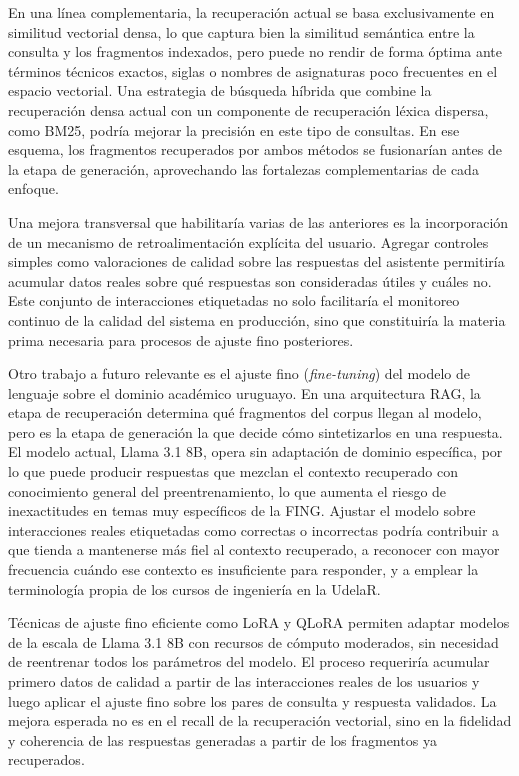 En una línea complementaria, la recuperación actual se basa exclusivamente en similitud vectorial densa, lo que captura bien la similitud semántica entre la consulta y los fragmentos indexados, pero puede no rendir de forma óptima ante términos técnicos exactos, siglas o nombres de asignaturas poco frecuentes en el espacio vectorial. Una estrategia de búsqueda híbrida que combine la recuperación densa actual con un componente de recuperación léxica dispersa, como BM25, podría mejorar la precisión en este tipo de consultas. En ese esquema, los fragmentos recuperados por ambos métodos se fusionarían antes de la etapa de generación, aprovechando las fortalezas complementarias de cada enfoque.

Una mejora transversal que habilitaría varias de las anteriores es la incorporación de un mecanismo de retroalimentación explícita del usuario. Agregar controles simples como valoraciones de calidad sobre las respuestas del asistente permitiría acumular datos reales sobre qué respuestas son consideradas útiles y cuáles no. Este conjunto de interacciones etiquetadas no solo facilitaría el monitoreo continuo de la calidad del sistema en producción, sino que constituiría la materia prima necesaria para procesos de ajuste fino posteriores.

Otro trabajo a futuro relevante es el ajuste fino (\textit{fine-tuning}) del modelo de lenguaje sobre el dominio académico uruguayo. En una arquitectura RAG, la etapa de recuperación determina qué fragmentos del corpus llegan al modelo, pero es la etapa de generación la que decide cómo sintetizarlos en una respuesta. El modelo actual, Llama 3.1 8B, opera sin adaptación de dominio específica, por lo que puede producir respuestas que mezclan el contexto recuperado con conocimiento general del preentrenamiento, lo que aumenta el riesgo de inexactitudes en temas muy específicos de la FING. Ajustar el modelo sobre interacciones reales etiquetadas como correctas o incorrectas podría contribuir a que tienda a mantenerse más fiel al contexto recuperado, a reconocer con mayor frecuencia cuándo ese contexto es insuficiente para responder, y a emplear la terminología propia de los cursos de ingeniería en la UdelaR.

Técnicas de ajuste fino eficiente como LoRA \cite{hu2022lora} y QLoRA \cite{dettmers2023qlora} permiten adaptar modelos de la escala de Llama 3.1 8B con recursos de cómputo moderados, sin necesidad de reentrenar todos los parámetros del modelo. El proceso requeriría acumular primero datos de calidad a partir de las interacciones reales de los usuarios y luego aplicar el ajuste fino sobre los pares de consulta y respuesta validados. La mejora esperada no es en el recall de la recuperación vectorial, sino en la fidelidad y coherencia de las respuestas generadas a partir de los fragmentos ya recuperados.

